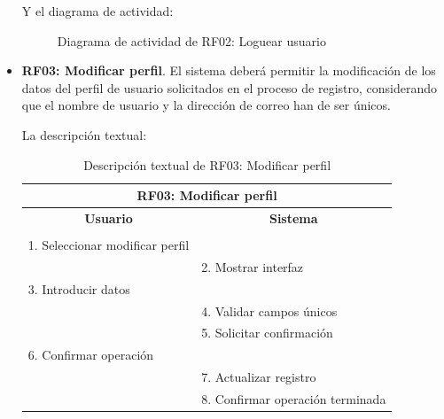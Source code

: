 \begin{itemize}
	Y el diagrama de actividad:
	\begin{figure}[!htb]
		\centering
		\caption{Diagrama de actividad de RF02: Loguear usuario}
		\label{fig:diagramaActividad_RF02}
	\end{figure}

	\FloatBarrier
	\item \textbf{RF03: Modificar perfil}. El sistema deberá permitir la modificación de los datos del perfil de usuario solicitados en el proceso de registro, considerando que el nombre de usuario y la dirección de correo han de ser únicos.
	
	La descripción textual:
	\begin{table}[h]
		\centering	
		\begin{tabular}{|l|l|}
			\hline
			\multicolumn{2}{|c|}{\textbf{RF03: Modificar perfil}} \\ \hline
			\multicolumn{1}{|c|}{\textbf{Usuario}} & \multicolumn{1}{c|}{\textbf{Sistema}} \\ \hline
			[Pto. inclusión: RF02: Loguear usuario] &\\ \hline
			1. Seleccionar modificar perfil &\\ \hline
			& 2. Mostrar interfaz\\ \hline
			3. Introducir datos &\\ \hline
			& 4. Validar campos únicos\\ \hline
			& 5. Solicitar confirmación\\ \hline
			6. Confirmar operación &\\ \hline
			& 7. Actualizar registro \\ \hline
			& 8. Confirmar operación terminada \\ \hline 
		\end{tabular}
		\caption{Descripción textual de RF03: Modificar perfil}
		\label{tab:tablaDescTextualRF03}
	\end{table}
	

\end{itemize}
